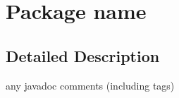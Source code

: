 \hypertarget{namespacename}{}\section{Package name}
\label{namespacename}


\subsection{Detailed Description}
any javadoc comments (including tags) 